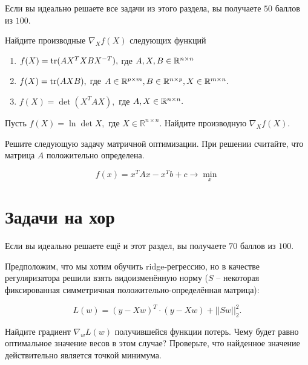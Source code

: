 \documentclass[12pt, a4paper, oneside]{article}
\begin{document}
Если вы идеально решаете все задачи из этого раздела, вы получаете $50$ баллов из $100$.

\begin{problem}{30}
    Найдите производные $\nabla_X f(X)$ следующих функций
    
    \begin{enumerate}
        \item  $f(X) = \operatorname{tr}(AX^TXBX^{-T}),$ где  $A, X, B \in \mathbb R^{n \times n}$ 
        
        \item  $f(X) = \operatorname{tr}(AXB),$ где $A \in \mathbb R^{p \times m}, B \in \mathbb R^{n \times p}, X  \in \mathbb R^{m \times n}.$ 
        
        \item  $f(X) = \det(X^TAX),$ где  $A, X \in \mathbb R^{n \times n}.$ 
    \end{enumerate}
\end{problem}

\begin{problem}{10}
    Пусть $f(X) = \ln \det X,$ где $X \in \mathbb{R}^{n\times n}$. Найдите производную $\nabla_X f(X)$.
\end{problem}

\newpage

\begin{problem}{10}
Решите следующую задачу матричной оптимизации. При решении считайте, что матрица $A$ положительно определена.

\[
f(x) = x^T A x - x^Tb + c \to \min_{x}
\]
\end{problem}


\section*{Задачи на хор}

Если вы идеально решаете ещё и этот раздел, вы получаете $70$ баллов из $100$.

\begin{problem}{20}
    Предположим, что мы хотим обучить ridge-регрессию, но в качестве регуляризатора решили взять видоизменённую норму ($S$ -- некоторая фиксированная симметричная положительно-определённая матрица):
    
    \[
    L(w) = (y - Xw)^T \cdot (y-Xw) + ||Sw||^2_2.
    \]
    
    Найдите градиент $\nabla_w L(w)$ получившейся функции потерь. Чему будет равно оптимальное значение весов в этом случае? Проверьте, что найденное значение действительно является точкой минимума. 
\end{problem}
\end{document}
